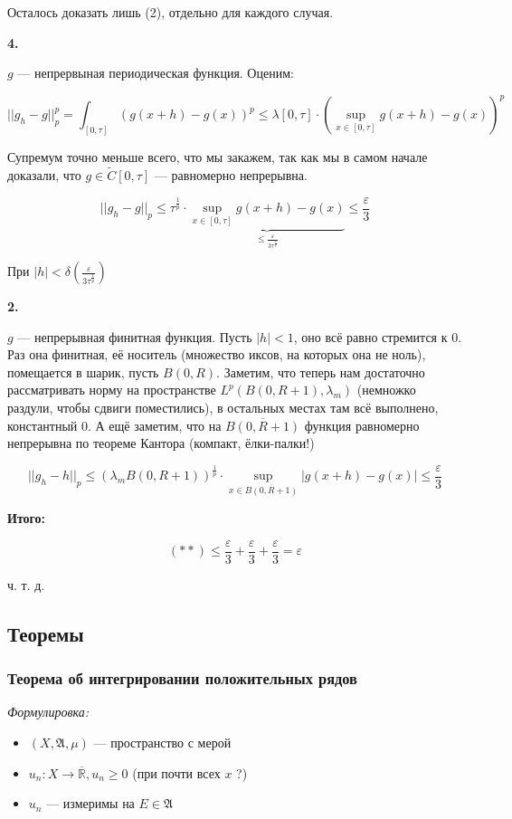 \documentclass{article}
\def\rinf{\overline{\mathbb{R}}}
\begin{document}
    Осталось доказать лишь (2), отдельно для каждого случая.

    \textbf{4.}

    $g$ --- непрервыная периодическая функция. Оценим:

    \[||g_h - g||_p^p = \int_{[0, \tau]} (g(x + h) - g(x))^p \le \lambda[0, \tau] \cdot \left(\sup_{x \in [0, \tau]} g(x + h) - g(x)\right)^p\]

    Супремум точно меньше всего, что мы закажем, так как мы в самом начале доказали, что $g \in \tilde{C}[0, \tau]$ --- равномерно непрерывна.

    \[||g_h - g||_p \le \tau^{\frac{1}{p}} \cdot \underbrace{\sup_{x \in [0, \tau]} g(x + h) - g(x)}_{\le \frac{\varepsilon}{3\tau^{\frac{1}{p}}}} \le \frac{\varepsilon}{3}\]

    При $|h| < \delta\left(\frac{\varepsilon}{3\tau^{\frac{1}{p}}}\right)$

    \textbf{2.}

    $g$ --- непрерывная финитная функция. Пусть $|h| < 1$, оно всё равно стремится к 0. Раз она финитная, её носитель (множество иксов, на которых она не ноль), помещается в шарик, пусть $B(0, R)$. Заметим, что теперь нам достаточно рассматривать норму на пространстве $L^p(B(0, R + 1), \lambda_m)$ (немножко раздули, чтобы сдвиги поместились), в остальных местах там всё выполнено, константный 0. А ещё заметим, что на $\overline{B(0, R + 1)}$ функция равномерно непрерывна по теореме Кантора (компакт, ёлки-палки!)

    \[||g_h - h||_p \le \left( \lambda_m B(0, R + 1)\right)^{\frac{1}{p}} \cdot \sup_{x \in \overline{B(0, R + 1)}} |g(x + h) - g(x)| \le \frac{\varepsilon}{3}\]

    \textbf{Итого:}

    \[(**) \le \frac{\varepsilon}{3} + \frac{\varepsilon}{3} + \frac{\varepsilon}{3} = \varepsilon\]

    ч. т. д. 

\newpage

\subsection{Теоремы}

\subsubsection{Теорема об интегрировании положительных рядов}
\textit{Формулировка:}

\begin{itemize}
    \item $(X, \mathfrak{A}, \mu)$ --- пространство с мерой
    \item $u_n: X \rightarrow \rinf, u_n \ge 0$ (при почти всех $x$ ?)
    \item $u_n$ --- измеримы на $E \in \mathfrak{A}$
\end{itemize}
\end{document}
